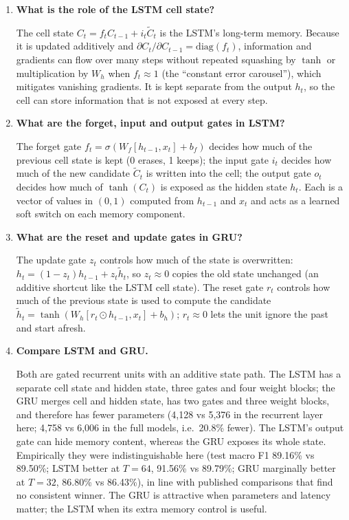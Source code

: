 \documentclass[10pt]{article}
\begin{document}
\begin{enumerate}[itemsep=6pt,topsep=3pt]
\item \textbf{What is the role of the LSTM cell state?}\par\smallskip
The cell state $C_t=f_tC_{t-1}+i_t\tilde{C}_t$ is the LSTM's long-term memory. Because it is updated additively and $\partial C_t/\partial C_{t-1}=\mathrm{diag}(f_t)$, information and gradients can flow over many steps without repeated squashing by $\tanh$ or multiplication by $W_h$ when $f_t\approx1$ (the ``constant error carousel''), which mitigates vanishing gradients. It is kept separate from the output $h_t$, so the cell can store information that is not exposed at every step.

\item \textbf{What are the forget, input and output gates in LSTM?}\par\smallskip
The forget gate $f_t=\sigma(W_f[h_{t-1},x_t]+b_f)$ decides how much of the previous cell state is kept (0 erases, 1 keeps); the input gate $i_t$ decides how much of the new candidate $\tilde{C}_t$ is written into the cell; the output gate $o_t$ decides how much of $\tanh(C_t)$ is exposed as the hidden state $h_t$. Each is a vector of values in $(0,1)$ computed from $h_{t-1}$ and $x_t$ and acts as a learned soft switch on each memory component.

\item \textbf{What are the reset and update gates in GRU?}\par\smallskip
The update gate $z_t$ controls how much of the state is overwritten: $h_t=(1-z_t)h_{t-1}+z_t\tilde{h}_t$, so $z_t\approx0$ copies the old state unchanged (an additive shortcut like the LSTM cell state). The reset gate $r_t$ controls how much of the previous state is used to compute the candidate $\tilde{h}_t=\tanh(W_h[r_t\odot h_{t-1},x_t]+b_h)$; $r_t\approx0$ lets the unit ignore the past and start afresh.

\item \textbf{Compare LSTM and GRU.}\par\smallskip
Both are gated recurrent units with an additive state path. The LSTM has a separate cell state and hidden state, three gates and four weight blocks; the GRU merges cell and hidden state, has two gates and three weight blocks, and therefore has fewer parameters (4,128 vs 5,376 in the recurrent layer here; 4,758 vs 6,006 in the full models, i.e.\ 20.8\% fewer). The LSTM's output gate can hide memory content, whereas the GRU exposes its whole state. Empirically they were indistinguishable here (test macro F1 89.16\% vs 89.50\%; LSTM better at $T{=}64$, 91.56\% vs 89.79\%; GRU marginally better at $T{=}32$, 86.80\% vs 86.43\%), in line with published comparisons that find no consistent winner. The GRU is attractive when parameters and latency matter; the LSTM when its extra memory control is useful.


\end{enumerate}
\end{document}
